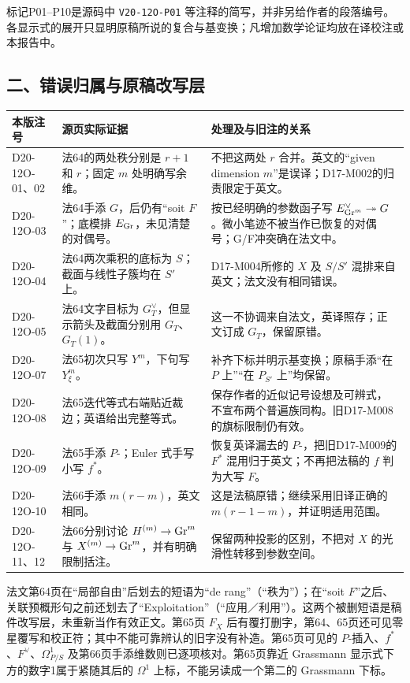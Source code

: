 标记P01--P10是源码中 \texttt{V20-12O-P01} 等注释的简写，并非另给作者的段落编号。各显示式的展开只显明原稿所说的复合与基变换；凡增加数学论证均放在译校注或本报告中。

\subsection*{二、错误归属与原稿改写层}

\begin{longtable}{@{}p{.18\linewidth}p{.33\linewidth}p{.40\linewidth}@{}}
\toprule
本版注号 & 源页实际证据 & 处理及与旧注的关系\\
\midrule
\endhead
D20-12O-01、02 & 法64的两处秩分别是 $r+1$ 和 $r$；固定 $m$ 处明确写余维。 & 不把这两处 $r$ 合并。英文的“given dimension $m$”是误译；D17-M002的归责限定于英文。\\
D20-12O-03 & 法64手添 $G$，后仍有“soit $F$”；底模排 $E_{\operatorname{Gr}}$，未见清楚的对偶号。 & 按已经明确的参数函子写 $E^\vee_{\operatorname{Gr}^m}\twoheadrightarrow G$。微小笔迹不被当作已恢复的对偶号；G/F冲突确在法文中。\\
D20-12O-04 & 法64两次乘积的底标为 $S$；截面与线性子簇均在 $S'$ 上。 & D17-M004所修的 $X$ 及 $S/S'$ 混排来自英文；法文没有相同错误。\\
D20-12O-05 & 法64文字目标为 $G_T^\vee$，但显示箭头及截面分别用 $G_T$、$G_T(1)$。 & 这一不协调来自法文，英译照存；正文订成 $G_T$，保留原错。\\
D20-12O-07 & 法65初次只写 $Y^m$，下句写 $Y^m_\xi$。 & 补齐下标并明示基变换；原稿手添“在 $P$ 上”“在 $P_{S'}$ 上”均保留。\\
D20-12O-08 & 法65迭代等式右端贴近裁边；英语给出完整等式。 & 保存作者的近似记号设想及可辨式，不宣布两个普遍族同构。旧D17-M008的旗标限制仍有效。\\
D20-12O-09 & 法65手添 $P$-；Euler 式手写小写 $f^*$。 & 恢复英译漏去的 $P$-，把旧D17-M009的 $F^*$ 混用归于英文；不再把法稿的 $f$ 判为大写 $F$。\\
D20-12O-10 & 法66手添 $m(r-m)$，英文相同。 & 这是法稿原错；继续采用旧译正确的 $m(r-1-m)$，并证明适用范围。\\
D20-12O-11、12 & 法66分别讨论 $H^{(m)}\to\operatorname{Gr}^m$ 与 $X^{(m)}\to\operatorname{Gr}^m$，并有明确限制括注。 & 保留两种投影的区别，不把对 $X$ 的光滑性转移到参数空间。\\
\bottomrule
\end{longtable}

法文第64页在“局部自由”后划去的短语为“de rang”（“秩为”）；在“soit $F$”之后、关联预概形句之前还划去了“Exploitation”（“应用／利用”）。这两个被删短语是稿件改写层，未重新当作有效正文。第65页 $F_X$ 后有覆打删字，第64、65页还可见零星覆写和校正符；其中不能可靠辨认的旧字没有补造。第65页可见的 $P$-插入、$f^*$、$F^\vee$、$\Omega^1_{P/S}$ 及第66页手添维数则已逐项核对。第65页靠近 Grassmann 显示式下方的数字1属于紧随其后的 $\Omega^1$ 上标，不能另读成一个第二的 Grassmann 下标。

